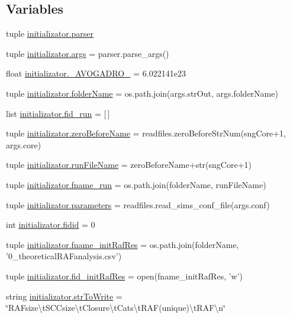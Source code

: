 \subsection*{Variables}
\begin{DoxyCompactItemize}
\item 
tuple \hyperlink{a00137_af2659789ba1896029e3ab9bfbf83d019}{initializator.\+parser}
\item 
tuple \hyperlink{a00137_aedb2e5b77a354ccd69d9d38b3c30f61a}{initializator.\+args} = parser.\+parse\+\_\+args()
\item 
float \hyperlink{a00137_a01b3b6a0972397f230c35bd2fb8effc4}{initializator.\+\_\+\+A\+V\+O\+G\+A\+D\+R\+O\+\_\+} = 6.\+022141e23
\item 
tuple \hyperlink{a00137_aa51c106700ef9afbdb94a1c800e10569}{initializator.\+folder\+Name} = os.\+path.\+join(args.\+str\+Out, args.\+folder\+Name)
\item 
list \hyperlink{a00137_a6015a676cc06fdae98b1cca15d92b883}{initializator.\+fid\+\_\+run} = \mbox{[}$\,$\mbox{]}
\item 
tuple \hyperlink{a00137_a475e51ace78f2490aa4206915d0e3ae6}{initializator.\+zero\+Before\+Name} = readfiles.\+zero\+Before\+Str\+Num(sng\+Core+1, args.\+core)
\item 
tuple \hyperlink{a00137_a47868487619848c8ead2458c6855426a}{initializator.\+run\+File\+Name} = zero\+Before\+Name+str(sng\+Core+1)
\item 
tuple \hyperlink{a00137_a6bc5100ec1c6492cec974172df243857}{initializator.\+fname\+\_\+run} = os.\+path.\+join(folder\+Name, run\+File\+Name)
\item 
tuple \hyperlink{a00137_a646de756d594b9a0eebf18c4eb9ee0d6}{initializator.\+parameters} = readfiles.\+read\+\_\+sims\+\_\+conf\+\_\+file(args.\+conf)
\item 
int \hyperlink{a00137_afdd976dc87dc056c8cba6926f9f98287}{initializator.\+fidid} = 0
\item 
tuple \hyperlink{a00137_a139a15a6b4127dd23049cb2b91a85d77}{initializator.\+fname\+\_\+init\+Raf\+Res} = os.\+path.\+join(folder\+Name, '0\+\_\+theoretical\+R\+A\+Fanalysis.\+csv')
\item 
tuple \hyperlink{a00137_a2f15742bdb2c2cebe65c8e9730915e28}{initializator.\+fid\+\_\+init\+Raf\+Res} = open(fname\+\_\+init\+Raf\+Res, 'w')
\item 
string \hyperlink{a00137_a2425798997b1c46c8bbed77ecffcaa9f}{initializator.\+str\+To\+Write} = \char`\"{}R\+A\+Fsize\textbackslash{}t\+S\+C\+Csize\textbackslash{}t\+Closure\textbackslash{}t\+Cats\textbackslash{}t\+R\+A\+F(unique)\textbackslash{}t\+R\+A\+F\textbackslash{}n\char`\"{}

\end{DoxyCompactItemize}
